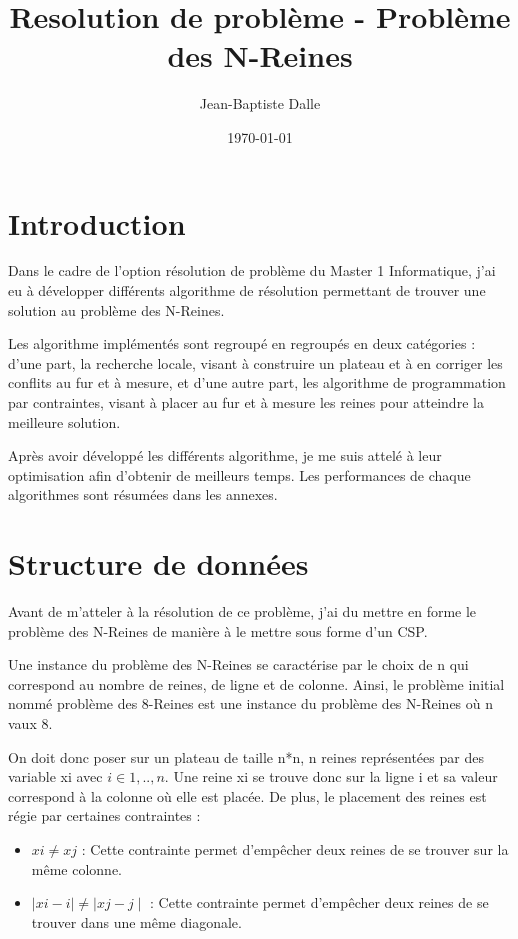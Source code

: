 \documentclass[a4paper,10pt]{article}
\title{Resolution de problème - Problème des N-Reines}
\author{Jean-Baptiste Dalle}
\date{\today}
\begin{document}
\maketitle

\newpage

\tableofcontents

\newpage

\section{Introduction}

Dans le cadre de l'option résolution de problème du Master 1 Informatique, j'ai eu à développer différents algorithme de résolution permettant de trouver une solution au problème des N-Reines.

Les algorithme implémentés sont regroupé en regroupés en deux catégories : d'une part, la recherche locale, visant à construire un plateau et à en corriger les conflits au fur et à mesure, et d'une autre part, les algorithme de programmation par contraintes, visant à placer au fur et à mesure les reines pour atteindre la meilleure solution.

Après avoir développé les différents algorithme, je me suis attelé à leur optimisation afin d'obtenir de meilleurs temps. Les performances de chaque algorithmes sont résumées dans les annexes.

\section{Structure de données}

Avant de m'atteler à la résolution de ce problème, j'ai du mettre en forme le problème des N-Reines de manière à le mettre sous forme d'un CSP.

Une instance du problème des N-Reines se caractérise par le choix de n qui correspond au nombre de reines, de ligne et de colonne. Ainsi, le problème initial nommé problème des 8-Reines est une instance du problème des N-Reines où n vaux 8.

On doit donc poser sur un plateau de taille n*n, n reines représentées par des variable xi avec $i \in {1,..,n}$. Une reine xi se trouve donc sur la ligne i et sa valeur correspond à la colonne où elle est placée. De plus, le placement des reines est régie par certaines contraintes : 

\begin{itemize}
 \item $xi \neq xj$ : Cette contrainte permet d'empêcher deux reines de se trouver sur la même colonne.
 \item $\mid xi - i\mid  \neq  \mid xj - j\mid$ : Cette contrainte permet d'empêcher deux reines de se trouver dans une même diagonale.
\end{itemize}
\end{document}
